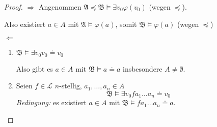 \documentclass[12pt,parskip=full]{scrartcl}
\newcommand{\heading}{\underline}
\theoremstyle{definition}
\begin{document}
	\begin{proof}
		\heading{$\Rightarrow$} Angenommen $\mathfrak{A} \preceq \mathfrak{B} \models \exists v_0 \varphi(v_0)$ (wegen $\preceq$).
		
		Also existiert $a \in A$ mit $\mathfrak{A} \models \varphi(a)$, somit $\mathfrak{B} \models \varphi(a)$ (wegen $\preceq$)
		
		\heading{$\Leftarrow$} 
		\begin{enumerate}
			\item $\mathfrak{B} \models \exists v_0 v_0 \doteq v_0$
		
			Also gibt es $a \in A$ mit $\mathfrak{B} \models a \doteq a$ insbesondere $A \neq \emptyset$.
			
			\item Seien $f \in \mathcal{L}$ $n$-stellig, $a_1, \dots, a_n \in A$
			\begin{equation*}
				\mathfrak{B} \models \exists v_0 f a_1 \dots a_n \doteq v_0
			\end{equation*}
			\textit{Bedingung:} es existiert $a \in A$ mit $\mathfrak{B} \models f a_1 \dots a_n \doteq a$.
			

\end{enumerate}
\end{proof}
\end{document}
